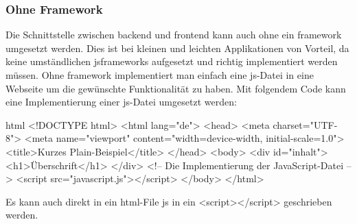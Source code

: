\subsubsection{Ohne Framework}
Die Schnittstelle zwischen \Gls{backend} und \Gls{frontend} kann auch ohne ein \Gls{framework} umgesetzt werden. Dies ist bei kleinen und leichten Applikationen von Vorteil, da keine umständlichen \Gls{jsframework}s aufgesetzt und richtig implementiert werden müssen. Ohne \Gls{framework} implementiert man einfach eine \Gls{js}-Datei in eine Webseite um die gewünschte Funktionalität zu haben. Mit folgendem Code kann eine Implementierung einer \Gls{js}-Datei umgesetzt werden:
\begin{code}{html}
	<!DOCTYPE html>
	<html lang="de">
		<head>
			<meta charset="UTF-8">
			<meta name="viewport" content="width=device-width, initial-scale=1.0">
			<title>Kurzes Plain-Beispiel</title>
		</head>
		<body>
			<div id="inhalt">
				<h1>Überschrift</h1>
			</div>
			<!-- Die Implementierung der JavaScript-Datei -->
			<script src="javascript.js"></script>
		</body>
	</html>
\end{code}
Es kann auch direkt in ein \Gls{html}-File \Gls{js} in ein <script></script> geschrieben werden.
